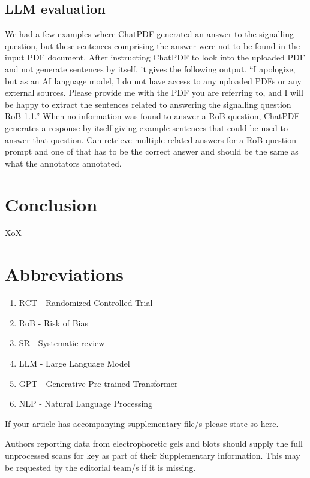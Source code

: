 \documentclass[sn-mathphys,Numbered]{sn-jnl}%
\theoremstyle{thmstyleone}%
\theoremstyle{thmstyletwo}%
\theoremstyle{thmstylethree}%
\begin{document}
\subsection{LLM evaluation}
\label{disc:llm}
%
We had a few examples where ChatPDF generated an answer to the signalling question, but these sentences comprising the answer were not to be found in the input PDF document.
After instructing ChatPDF to look into the uploaded PDF and not generate sentences by itself, it gives the following output.
``I apologize, but as an AI language model, I do not have access to any uploaded PDFs or any external sources. Please provide me with the PDF you are referring to, and I will be happy to extract the sentences related to answering the signalling question RoB 1.1.''
When no information was found to answer a RoB question, ChatPDF generates a response by itself giving example sentences that could be used to answer that question.
Can retrieve multiple related answers for a RoB question prompt and one of that has to be the correct answer and should be the same as what the annotators annotated.

%
%
%
\section{Conclusion}
\label{sec:conclusion}
%
XoX
%
%
%
\section{Abbreviations}%
%
\begin{enumerate}
    \item RCT - Randomized Controlled Trial
    \item RoB - Risk of Bias
    \item SR - Systematic review
    \item LLM - Large Language Model
    \item GPT - Generative Pre-trained Transformer
    \item NLP - Natural Language Processing
\end{enumerate}
%
%
%
\backmatter


If your article has accompanying supplementary file/s please state so here. 

Authors reporting data from electrophoretic gels and blots should supply the full unprocessed scans for key as part of their Supplementary information. This may be requested by the editorial team/s if it is missing.
\end{document}
